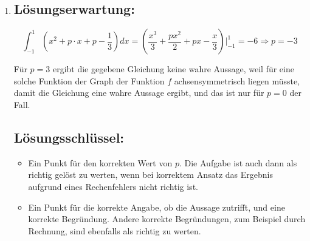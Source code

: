 \begin{langesbeispiel}
{\begin{enumerate}
		Es gilt: $\frac{p^2}{4}+1>\frac{p^2}{4}$ und somit auch $\sqrt{\frac{p^2}{4}+1}>\frac{p}{2}$.
		
		Daraus folgt: $-\frac{p}{2}+\sqrt{\frac{p^2}{4}+1}>0$ und $-\frac{p}{2}-\sqrt{\frac{p^2}{4}+1}<0 \Rightarrow$ Es gibt immer genau eine positive und eine negative Lösung in $\mathbb{R}$.

	\subsection{Lösungsschlüssel:}
	
\begin{itemize}
	\item Ein Ausgleichspunkt für eine korrekte rechnerische Begründung. 
	\item EEin Punkt für eine (sinngemäß) korrekte Begründung dafür, dass die Parabel genau eine positive und eine negative Nullstelle hat. 
\end{itemize}

\item \subsection{Lösungserwartung:}
			
		$$\int^1_{-1}{\left(x^2+p\cdot x+p-\frac{1}{3}\right)}dx=\left(\frac{x^3}{3}+\frac{px^2}{2}+px-\frac{x}{3}\right)\Bigg|^1_{-1}=-6 \Rightarrow p=-3$$
		
		Für $p=3$ ergibt die gegebene Gleichung keine wahre Aussage, weil für eine solche Funktion der Graph der Funktion $f$ achsensymmetrisch liegen müsste, damit die Gleichung eine wahre Aussage ergibt, und das ist nur für $p=0$ der Fall.

	\subsection{Lösungsschlüssel:}
	
\begin{itemize}
	\item Ein Punkt für den korrekten Wert von $p$. Die Aufgabe ist auch dann als richtig gelöst zu werten, wenn bei korrektem Ansatz das Ergebnis aufgrund eines Rechenfehlers nicht richtig ist. 
	\item  Ein Punkt für die korrekte Angabe, ob die Aussage zutrifft, und eine korrekte Begründung. Andere korrekte Begründungen, zum Beispiel durch Rechnung, sind ebenfalls als richtig zu werten. 
\end{itemize}
\end{enumerate}}
		\end{langesbeispiel}